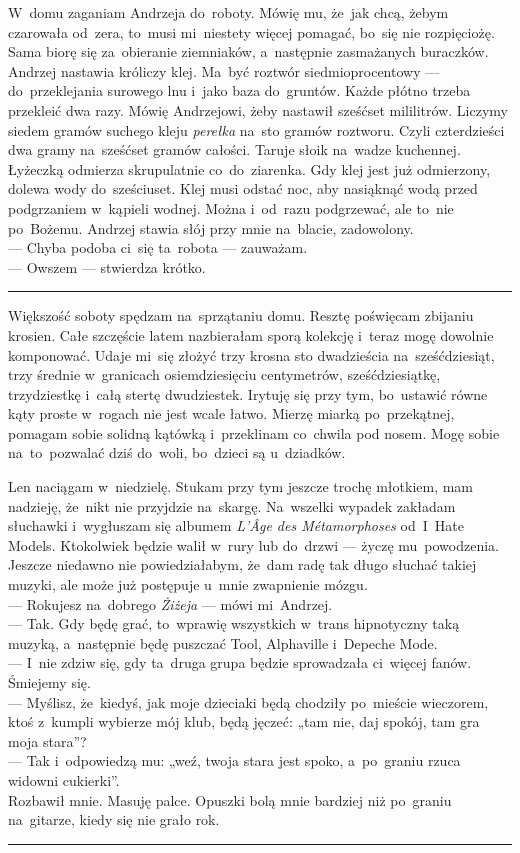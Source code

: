 \documentclass[9pt, a5paper]{memoir}
\begin{document}
W~domu zaganiam Andrzeja do~roboty. Mówię mu, że~jak chcą, żebym czarowała od~zera, to~musi mi~niestety więcej pomagać, bo~się nie rozpięciożę. Sama biorę się za~obieranie ziemniaków, a~następnie zasmażanych buraczków. Andrzej nastawia króliczy klej. Ma~być roztwór siedmioprocentowy --- do~przeklejania surowego lnu i~jako baza do~gruntów. Każde płótno trzeba przekleić dwa razy. Mówię Andrzejowi, żeby nastawił sześćset mililitrów. Liczymy siedem gramów suchego kleju \textit{perełka} na~sto gramów roztworu. Czyli czterdzieści dwa gramy na~sześćset gramów całości. Taruje słoik na~wadze kuchennej. Łyżeczką odmierza skrupulatnie co~do~ziarenka. Gdy klej jest już odmierzony, dolewa wody do~sześciuset. Klej musi odstać noc, aby nasiąknąć wodą przed podgrzaniem w~kąpieli wodnej. Można i~od~razu podgrzewać, ale to~nie po~Bożemu. Andrzej stawia słój przy mnie na~blacie, zadowolony.\\
--- Chyba podoba ci~się ta~robota --- zauważam.\\
--- Owszem --- stwierdza krótko.

\fancybreak{* \quad * \quad *}

Większość soboty spędzam na~sprzątaniu domu. Resztę poświęcam zbijaniu krosien. Całe szczęście latem nazbierałam sporą kolekcję i~teraz mogę dowolnie komponować. Udaje mi~się złożyć trzy krosna sto dwadzieścia na~sześćdziesiąt, trzy średnie w~granicach osiemdziesięciu centymetrów, sześćdziesiątkę, trzydziestkę i~całą stertę dwudziestek. Irytuję się przy tym, bo~ustawić równe kąty proste w~rogach nie jest wcale łatwo. Mierzę miarką po~przekątnej, pomagam sobie solidną kątówką i~przeklinam co~chwila pod nosem. Mogę sobie na~to~pozwalać dziś do~woli, bo~dzieci są u~dziadków.

Len naciągam w~niedzielę. Stukam przy tym jeszcze trochę młotkiem, mam nadzieję, że~nikt nie przyjdzie na~skargę. Na~wszelki wypadek zakładam słuchawki i~wygłuszam się albumem \textit{L'\^Age des M\'etamorphoses} od~I~Hate Models. Ktokolwiek będzie walił w~rury lub do~drzwi --- życzę mu~powodzenia. Jeszcze niedawno nie powiedziałabym, że~dam radę tak długo słuchać takiej muzyki, ale może już postępuje u~mnie zwapnienie mózgu.\\
--- Rokujesz na~dobrego \textit{Żiżeja} --- mówi mi~Andrzej.\\
--- Tak. Gdy będę grać, to~wprawię wszystkich w~trans hipnotyczny taką muzyką, a~następnie będę puszczać Tool, Alphaville i~Depeche Mode.\\
--- I~nie zdziw się, gdy ta~druga grupa będzie sprowadzała ci~więcej fanów.\\
Śmiejemy się.\\
--- Myślisz, że~kiedyś, jak moje dzieciaki będą chodziły po~mieście wieczorem, ktoś z~kumpli wybierze mój klub, będą jęczeć: „tam nie, daj spokój, tam gra moja stara”?\\
--- Tak i~odpowiedzą mu: „weź, twoja stara jest spoko, a~po~graniu rzuca widowni cukierki”.\\
Rozbawił mnie. Masuję palce. Opuszki bolą mnie bardziej niż po~graniu na~gitarze, kiedy się nie grało rok.
\fancybreak{* \quad * \quad *}
\end{document}
